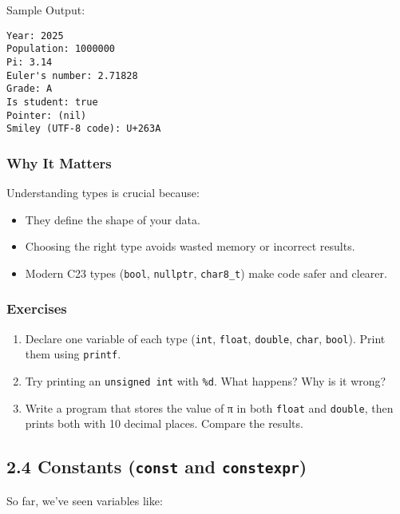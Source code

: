 \documentclass[
  letterpaper,
  DIV=11,
  numbers=noendperiod]{scrreprt}
\providecommand{\tightlist}{%
  \setlength{\itemsep}{0pt}\setlength{\parskip}{0pt}}
\begin{document}
Sample Output:

\begin{verbatim}
Year: 2025
Population: 1000000
Pi: 3.14
Euler's number: 2.71828
Grade: A
Is student: true
Pointer: (nil)
Smiley (UTF-8 code): U+263A
\end{verbatim}

\subsubsection{Why It Matters}\label{why-it-matters-7}

Understanding types is crucial because:

\begin{itemize}
\tightlist
\item
  They define the shape of your data.
\item
  Choosing the right type avoids wasted memory or incorrect results.
\item
  Modern C23 types (\texttt{bool}, \texttt{nullptr}, \texttt{char8\_t})
  make code safer and clearer.
\end{itemize}

\subsubsection{Exercises}\label{exercises-7}

\begin{enumerate}
\def\labelenumi{\arabic{enumi}.}
\tightlist
\item
  Declare one variable of each type (\texttt{int}, \texttt{float},
  \texttt{double}, \texttt{char}, \texttt{bool}). Print them using
  \texttt{printf}.
\item
  Try printing an \texttt{unsigned\ int} with \texttt{\%d}. What
  happens? Why is it wrong?
\item
  Write a program that stores the value of π in both \texttt{float} and
  \texttt{double}, then prints both with 10 decimal places. Compare the
  results.
\end{enumerate}

\subsection{\texorpdfstring{2.4 Constants (\texttt{const} and
\texttt{constexpr})}{2.4 Constants (const and constexpr)}}\label{constants-const-and-constexpr}

So far, we've seen variables like:
\end{document}
